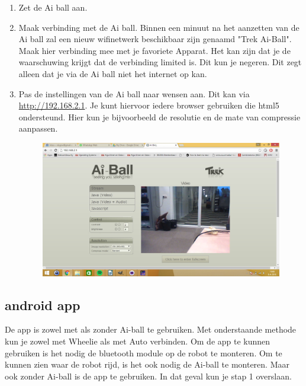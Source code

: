 \documentclass[12pt,a4paper]{article}
\begin{document}
\begin{enumerate}
	\item Zet de Ai ball aan.
	\item Maak verbinding met de Ai ball. 
	Binnen een minuut na het aanzetten van de Ai ball zal een nieuw wifinetwerk beschikbaar zijn genaamd "Trek Ai-Ball".  Maak hier verbinding mee met je favoriete Apparat. Het kan zijn dat je de waarschuwing krijgt dat de verbinding limited is. Dit kun je negeren. Dit zegt alleen dat je via de Ai ball niet het internet op kan. 
	\item Pas de instellingen van de Ai ball naar wensen aan. 
	Dit kan via \url{http://192.168.2.1}. Je kunt hiervoor iedere browser gebruiken die html5 ondersteund. Hier kun je bijvoorbeeld de resolutie en de mate van compressie aanpassen.
	\begin{figure}[h]
		\centering
		\includegraphics[width=0.7\linewidth]{trek_settings}
		\label{fig:trek_settings}
	\end{figure}
\end{enumerate}

\subsection{android app}
De app is zowel met als zonder Ai-ball te gebruiken. Met onderstaande methode kun je zowel met Wheelie als met Auto verbinden. Om de app te kunnen gebruiken is het nodig de bluetooth module op de robot te monteren. Om te kunnen zien waar de robot rijd, is het ook nodig de Ai-ball te monteren. Maar ook zonder Ai-ball is de app te gebruiken. In dat geval kun je stap 1 overslaan.
\end{document}
